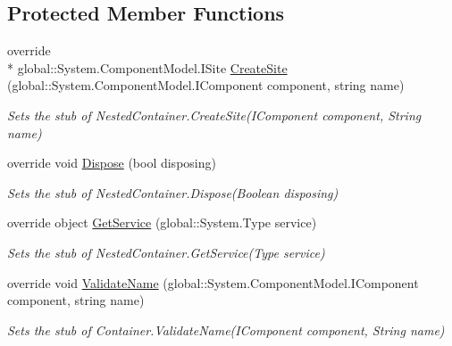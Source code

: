 \subsection*{Protected Member Functions}
\begin{DoxyCompactItemize}
\item 
override \\*
global\-::\-System.\-Component\-Model.\-I\-Site \hyperlink{class_system_1_1_component_model_1_1_fakes_1_1_stub_nested_container_a2c0639a1d428dd58cab02395888341cb}{Create\-Site} (global\-::\-System.\-Component\-Model.\-I\-Component component, string name)
\begin{DoxyCompactList}\small\item\em Sets the stub of Nested\-Container.\-Create\-Site(\-I\-Component component, String name)\end{DoxyCompactList}\item 
override void \hyperlink{class_system_1_1_component_model_1_1_fakes_1_1_stub_nested_container_a54a0eac0562441cfe60716f87ab43ecc}{Dispose} (bool disposing)
\begin{DoxyCompactList}\small\item\em Sets the stub of Nested\-Container.\-Dispose(\-Boolean disposing)\end{DoxyCompactList}\item 
override object \hyperlink{class_system_1_1_component_model_1_1_fakes_1_1_stub_nested_container_a1f1e1d6c48f9b4e0b0287e511d8326ab}{Get\-Service} (global\-::\-System.\-Type service)
\begin{DoxyCompactList}\small\item\em Sets the stub of Nested\-Container.\-Get\-Service(\-Type service)\end{DoxyCompactList}\item 
override void \hyperlink{class_system_1_1_component_model_1_1_fakes_1_1_stub_nested_container_a6484b06a14bc02b1efea686c2cd507c6}{Validate\-Name} (global\-::\-System.\-Component\-Model.\-I\-Component component, string name)
\begin{DoxyCompactList}\small\item\em Sets the stub of Container.\-Validate\-Name(\-I\-Component component, String name)\end{DoxyCompactList}\end{DoxyCompactItemize}
